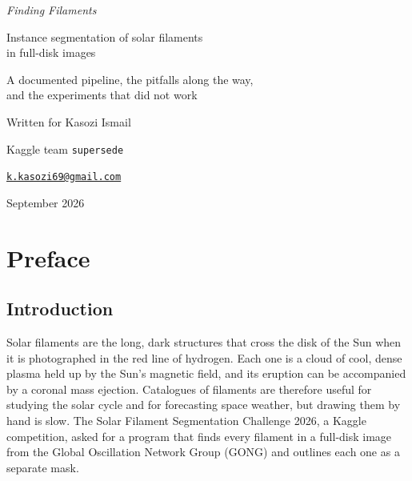\documentclass[11pt,oneside]{book}
\begin{document}
\frontmatter

\begin{titlepage}
\centering
\vspace*{1.2in}
{\fontsize{34}{40}\selectfont\itshape Finding Filaments\par}
\vspace{0.25in}
{\Large Instance segmentation of solar filaments\\ in full-disk \Ha{} images\par}
\vspace{0.5in}
{\large A documented pipeline, the pitfalls along the way,\\ and the experiments that did not work\par}
\vfill
{}
\par\vspace{0.3in}
{\large Written for Kasozi Ismail\par}
\vspace{0.12in}
{\normalsize Kaggle team \texttt{supersede}\par}
\vspace{0.04in}
{\normalsize\href{mailto:k.kasozi69@gmail.com}{\texttt{k.kasozi69@gmail.com}}\par}
\vspace{0.2in}
{\normalsize September 2026\par}
\vspace*{0.4in}
\end{titlepage}

\chapter*{Preface}

\section*{Introduction}
Solar filaments are the long, dark structures that cross the disk of the Sun when it is
photographed in the red \Ha{} line of hydrogen. Each one is a cloud of cool, dense plasma held up
by the Sun's magnetic field, and its eruption can be accompanied by a coronal mass ejection.
Catalogues of filaments are therefore useful for studying the solar cycle and for forecasting
space weather, but drawing them by hand is slow. The Solar Filament Segmentation Challenge 2026, a
Kaggle competition, asked for a program that finds every filament in a full-disk \Ha{} image from
the Global Oscillation Network Group (GONG) and outlines each one as a separate mask.
\end{document}
